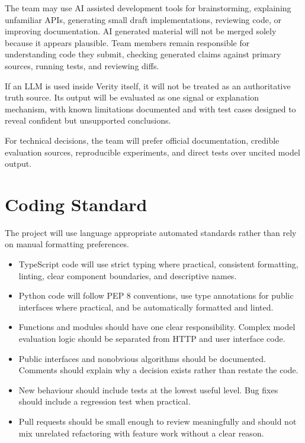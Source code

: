 \documentclass{article}
\begin{document}
The team may use AI assisted development tools for brainstorming, explaining unfamiliar APIs, generating small draft implementations, reviewing code, or improving documentation. AI generated material will not be merged solely because it appears plausible. Team members remain responsible for understanding code they submit, checking generated claims against primary sources, running tests, and reviewing diffs.

If an LLM is used inside Verity itself, it will not be treated as an authoritative truth source. Its output will be evaluated as one signal or explanation mechanism, with known limitations documented and with test cases designed to reveal confident but unsupported conclusions.

For technical decisions, the team will prefer official documentation, credible evaluation sources, reproducible experiments, and direct tests over uncited model output.

\section{Coding Standard}

The project will use language appropriate automated standards rather than rely on manual formatting preferences.

\begin{itemize}[leftmargin=*]
    \item TypeScript code will use strict typing where practical, consistent formatting, linting, clear component boundaries, and descriptive names.
    \item Python code will follow PEP 8 conventions, use type annotations for public interfaces where practical, and be automatically formatted and linted.
    \item Functions and modules should have one clear responsibility. Complex model evaluation logic should be separated from HTTP and user interface code.
    \item Public interfaces and nonobvious algorithms should be documented. Comments should explain why a decision exists rather than restate the code.
    \item New behaviour should include tests at the lowest useful level. Bug fixes should include a regression test when practical.
    \item Pull requests should be small enough to review meaningfully and should not mix unrelated refactoring with feature work without a clear reason.
\end{itemize}
\end{document}
